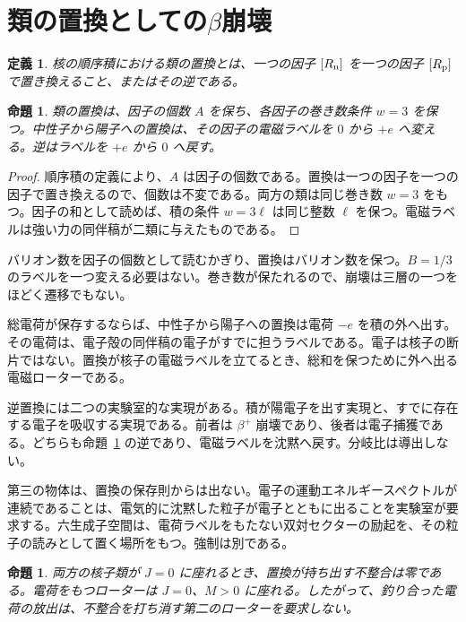 \documentclass[a4paper]{article}
\newtheorem{proposition}[lemma]{命題}
\newtheorem{definition}[lemma]{定義}
\begin{document}
\section{類の置換としての\texorpdfstring{\(\beta\)}{β}崩壊}
\label{sec:decay}

\begin{definition}
\label{def:replacement}
核の順序積における\emph{類の置換}とは、一つの因子 \([R_{\rm n}]\) を一つの因子 \([R_{\rm p}]\) で置き換えること、またはその逆である。
\end{definition}

\begin{proposition}
\label{prop:conserved}
類の置換は、因子の個数 \(A\) を保ち、各因子の巻き数条件 \(w=3\) を保つ。中性子から陽子への置換は、その因子の電磁ラベルを \(0\) から \(+e\) へ変える。逆はラベルを \(+e\) から \(0\) へ戻す。
\end{proposition}

\begin{proof}
順序積の定義により、\(A\) は因子の個数である。置換は一つの因子を一つの因子で置き換えるので、個数は不変である。両方の類は同じ巻き数 \(w=3\) をもつ。因子の和として読めば、積の条件 \(w=3\ell\) は同じ整数 \(\ell\) を保つ。電磁ラベルは強い力の同伴稿が二類に与えたものである。
\end{proof}

バリオン数を因子の個数として読むかぎり、置換はバリオン数を保つ。\(B=1/3\) のラベルを一つ変える必要はない。巻き数が保たれるので、崩壊は三層の一つをほどく遷移でもない。

総電荷が保存するならば、中性子から陽子への置換は電荷 \(-e\) を積の外へ出す。その電荷は、電子殻の同伴稿の電子がすでに担うラベルである。電子は核子の断片ではない。置換が核子の電磁ラベルを立てるとき、総和を保つために外へ出る電磁ローターである。

逆置換には二つの実験室的な実現がある。積が陽電子を出す実現と、すでに存在する電子を吸収する実現である。前者は \(\beta^{+}\) 崩壊であり、後者は電子捕獲である。どちらも命題~\ref{prop:conserved} の逆であり、電磁ラベルを沈黙へ戻す。分岐比は導出しない。

第三の物体は、置換の保存則からは出ない。電子の運動エネルギースペクトルが連続であることは、電気的に沈黙した粒子が電子とともに出ることを実験室が要求する。六生成子空間は、電荷ラベルをもたない双対セクターの励起を、その粒子の読みとして置く場所をもつ。強制は別である。

\begin{proposition}
\label{prop:no-third}
両方の核子類が \(J=0\) に座れるとき、置換が持ち出す不整合は零である。電荷をもつローターは \(J=0\)、\(M>0\) に座れる。したがって、釣り合った電荷の放出は、不整合を打ち消す第二のローターを要求しない。
\end{proposition}
\end{document}
